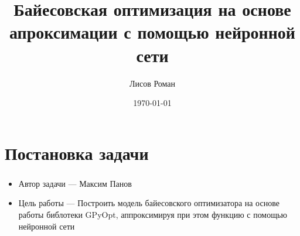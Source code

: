 \documentclass[t]{beamer}
\title{Байесовская оптимизация на основе апроксимации с помощью нейронной сети	}
\author{Лисов Роман}
\date{\today}
\institute[МФТИ]{Московский физико-технический институт\\ (государственный университет)}
\begin{document}
\begin{comment} 
\end{comment}


\frame[plain]{\titlepage}	%


\section{Постановка задачи}

\begin{frame}
	\frametitle{\insertsection}
	\framesubtitle{\insertsubsection}
	
	\begin{itemize}
		\item \alert{Автор задачи} --- Максим Панов
		\item \alert{Цель работы} --- Построить модель байесовского оптимизатора на основе работы библотеки GPyOpt, аппроксимируя при этом функцию с помощью нейронной сети
	\end{itemize}
\end{frame}
 
\end{document}
